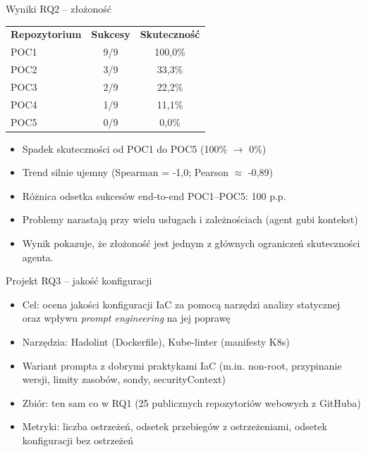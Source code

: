 \documentclass[aspectratio=169]{beamer}
\begin{document}
\begin{frame}{Wyniki RQ2 -- złożoność}
    \small
    \begin{center}
        \begin{tabular}{lcc}
            \textbf{Repozytorium} & \textbf{Sukcesy} & \textbf{Skuteczność} \\
            POC1 & 9/9 & 100,0\% \\
            POC2 & 3/9 & 33,3\% \\
            POC3 & 2/9 & 22,2\% \\
            POC4 & 1/9 & 11,1\% \\
            POC5 & 0/9 & 0,0\% \\
        \end{tabular}
    \end{center}
    \begin{itemize}
        \item Spadek skuteczności od POC1 do POC5 (100\% $\rightarrow$ 0\%)
        \item Trend silnie ujemny (Spearman = -1,0; Pearson $\approx$ -0,89)
        \item Różnica odsetka sukcesów end-to-end POC1--POC5: 100 p.p.
        \item Problemy narastają przy wielu usługach i zależnościach (agent gubi kontekst)
        \item Wynik pokazuje, że złożoność jest jednym z głównych ograniczeń skuteczności agenta.
    \end{itemize}
\end{frame}

\begin{frame}{Projekt RQ3 -- jakość konfiguracji}
    \begin{itemize}
        \item Cel: ocena jakości konfiguracji IaC za pomocą narzędzi analizy statycznej oraz wpływu \textit{prompt engineering} na jej poprawę
        \item Narzędzia: Hadolint (Dockerfile), Kube-linter (manifesty K8s)
        \item Wariant prompta z dobrymi praktykami IaC (m.in. non-root, przypinanie wersji, limity zasobów, sondy, securityContext)
        \item Zbiór: ten sam co w RQ1 (25 publicznych repozytoriów webowych z GitHuba)
        \item Metryki: liczba ostrzeżeń, odsetek przebiegów z ostrzeżeniami, odsetek konfiguracji bez ostrzeżeń
    \end{itemize}
\end{frame}
\end{document}
